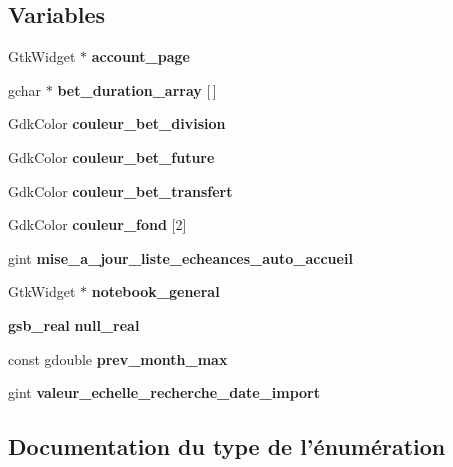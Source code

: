 \subsection*{Variables}
\begin{DoxyCompactItemize}
\item 
GtkWidget $\ast$ {\bf account\_\-page}
\item 
gchar $\ast$ {\bf bet\_\-duration\_\-array} [$\,$]
\item 
GdkColor {\bf couleur\_\-bet\_\-division}
\item 
GdkColor {\bf couleur\_\-bet\_\-future}
\item 
GdkColor {\bf couleur\_\-bet\_\-transfert}
\item 
GdkColor {\bf couleur\_\-fond} [2]
\item 
gint {\bf mise\_\-a\_\-jour\_\-liste\_\-echeances\_\-auto\_\-accueil}
\item 
GtkWidget $\ast$ {\bf notebook\_\-general}
\item 
{\bf gsb\_\-real} {\bf null\_\-real}
\item 
const gdouble {\bf prev\_\-month\_\-max}
\item 
gint {\bf valeur\_\-echelle\_\-recherche\_\-date\_\-import}
\end{DoxyCompactItemize}


\subsection{Documentation du type de l'énumération}
